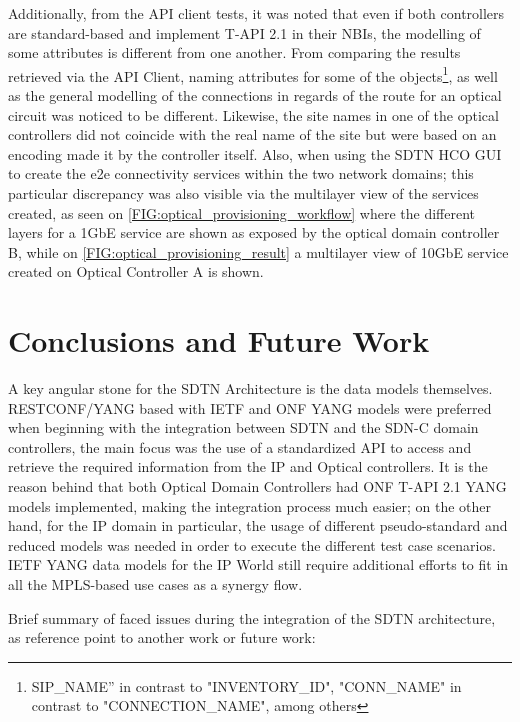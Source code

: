 \documentclass[a4paper,fleqn]{cas-dc}
\begin{document}
Additionally, from the API client tests, it was noted that even if both controllers are standard-based and implement T-API 2.1 in their NBIs, the modelling of some attributes is different from one another. From comparing the results retrieved via the API Client, naming attributes for some of the objects\footnote{SIP\_NAME” in contrast to "INVENTORY\_ID", "CONN\_NAME" in contrast to "CONNECTION\_NAME", among others}, as well as the general modelling of the connections in regards of the route for an optical circuit was noticed to be different. Likewise, the site names in one of the optical controllers did not coincide with the real name of the site but were based on an encoding made it by the controller itself. Also, when using the SDTN HCO GUI to create the e2e connectivity services within the two network domains; this particular discrepancy was also visible via the multilayer view of the services created, as seen on \cref{FIG:optical_provisioning_workflow} where the different layers for a 1GbE service are shown as exposed by the optical domain controller B, while on \cref{FIG:optical_provisioning_result} a multilayer view of 10GbE service created on Optical Controller A is shown.


\section{Conclusions and Future Work}
\label{section:conclusions}
A key angular stone for the SDTN Architecture is the data models themselves. RESTCONF/YANG based with IETF and ONF YANG models were preferred when beginning with the integration between SDTN and the SDN-C domain controllers, the main focus was the use of a standardized API to access and retrieve the required information from the IP and Optical controllers. It is the reason behind that both Optical Domain Controllers had ONF T-API 2.1 YANG models implemented, making the integration process much easier; on the other hand, for the IP domain in particular, the usage of different pseudo-standard and reduced models was needed in order to execute the different test case scenarios. IETF YANG data models for the IP World still require additional efforts to fit in all the MPLS-based use cases as a synergy flow. 

Brief summary of faced issues during the integration of the SDTN architecture, as reference point to another work or future work: 
\end{document}
